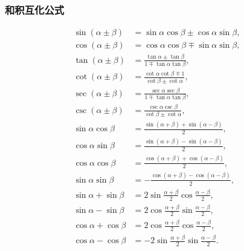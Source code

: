 \subsubsection{和积互化公式}
\begin{theorem}[和积互化公式]
\begin{align}
	\sin(\alpha\pm\beta) &= \sin\alpha\cos\beta\pm\cos\alpha\sin\beta, \label{equation:函数.三角函数.和积互化公式1} \\
	\cos(\alpha\pm\beta) &= \cos\alpha\cos\beta\mp\sin\alpha\sin\beta, \label{equation:函数.三角函数.和积互化公式2} \\
	\tan(\alpha\pm\beta) &= \frac{\tan\alpha\pm\tan\beta}{1\mp\tan\alpha\tan\beta}, \label{equation:函数.三角函数.和积互化公式3} \\
	\cot(\alpha\pm\beta) &= \frac{\cot\alpha\cot\beta\mp 1}{\cot\beta\pm\cot\alpha}, \label{equation:函数.三角函数.和积互化公式4} \\
	\sec(\alpha\pm\beta) &= \frac{\sec\alpha\sec\beta}{1\mp\tan\alpha\tan\beta}, \label{equation:函数.三角函数.和积互化公式5} \\
	\csc(\alpha\pm\beta) &= \frac{\csc\alpha\csc\beta}{\cot\beta\pm\cot\alpha}, \label{equation:函数.三角函数.和积互化公式6} \\
	\sin \alpha \cos \beta &= \frac{\sin (\alpha + \beta) + \sin (\alpha - \beta)}{2}, \label{equation:函数.三角函数.和积互化公式7} \\
	\cos \alpha \sin \beta &= \frac{\sin (\alpha + \beta) - \sin (\alpha - \beta)}{2}, \label{equation:函数.三角函数.和积互化公式8} \\
	\cos \alpha \cos \beta &= \frac{\cos (\alpha + \beta) + \cos (\alpha - \beta)}{2}, \label{equation:函数.三角函数.和积互化公式9} \\
	\sin \alpha \sin \beta &= -\frac{\cos (\alpha + \beta) - \cos (\alpha - \beta)}{2}, \label{equation:函数.三角函数.和积互化公式10} \\
	\sin \alpha + \sin \beta &= 2 \sin \frac{\alpha + \beta}{2} \cos \frac{\alpha - \beta}{2}, \label{equation:函数.三角函数.和积互化公式11} \\
	\sin \alpha - \sin \beta &= 2 \cos \frac{\alpha + \beta}{2} \sin \frac{\alpha - \beta}{2}, \label{equation:函数.三角函数.和积互化公式12} \\
	\cos \alpha + \cos \beta &= 2 \cos \frac{\alpha + \beta}{2} \cos \frac{\alpha - \beta}{2}, \label{equation:函数.三角函数.和积互化公式13} \\
	\cos \alpha - \cos \beta &= -2 \sin \frac{\alpha + \beta}{2} \sin \frac{\alpha - \beta}{2}. \label{equation:函数.三角函数.和积互化公式14}

\end{align}
\end{theorem}
